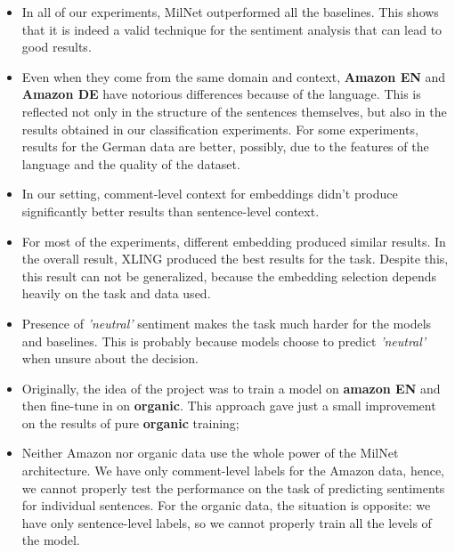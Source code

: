\begin{itemize}
    \item In all of our experiments, MilNet outperformed all the baselines. This shows that it is indeed a valid technique for the sentiment analysis that can lead to good results.
    \item Even when they come from the same domain and context, {\bf Amazon EN} and {\bf Amazon DE} have notorious differences because of the language. This is reflected not only in the structure of the sentences themselves, but also in the results obtained in our classification experiments. For some experiments, results for the German data are better, possibly, due to the features of the language and the quality of the dataset.
    \item In our setting, comment-level context for embeddings didn't produce significantly better results than sentence-level context.
    \item For most of the experiments, different embedding produced similar results. In the overall result, XLING produced the best results for the task. Despite this, this result can not be generalized, because the embedding selection depends heavily on the task and data used.
    \item Presence of {\it 'neutral'} sentiment makes the task much harder for the models and baselines. This is probably because models choose to predict {\it 'neutral'} when unsure about the decision.
    \item Originally, the idea of the project was to train a model on {\bf amazon EN} and then fine-tune in on {\bf organic}. This approach gave just a small improvement on the results of pure {\bf organic} training;
    \item Neither Amazon nor organic data use the whole power of the MilNet architecture. We have only comment-level labels for the Amazon data, hence, we cannot properly test the performance on the task of predicting sentiments for individual sentences. For the organic data, the situation is opposite: we have only sentence-level labels, so we cannot properly train all the levels of the model.
\end{itemize}